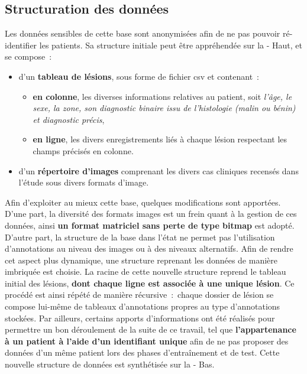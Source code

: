 \subsection{Structuration des données}
\label{sec:dataset_organisation}
Les données sensibles de cette base sont anonymisées afin de ne pas pouvoir ré-identifier les patients. Sa structure initiale peut être appréhendée sur la  - Haut, et se compose~:
\begin{itemize}
    \item d'un \textbf{tableau de lésions}, sous forme de fichier \gls{csv} et contenant~:
    \begin{itemize}
        \item \textbf{en colonne}, les diverses informations relatives au patient, soit \textit{l'âge, le sexe, la zone, son diagnostic binaire issu de l'histologie (malin ou bénin) et diagnostic précis},
        \item \textbf{en ligne}, les divers enregistrements liés à chaque lésion respectant les champs précisés en colonne.
    \end{itemize}
    \item d'un \textbf{répertoire d'images} comprenant les divers cas cliniques recensés dans l'étude sous divers formats d'image.
\end{itemize}\par

Afin d'exploiter au mieux cette base, quelques modifications sont apportées. D'une part, la diversité des formats images est un frein quant à la gestion de ces données, ainsi \textbf{un format matriciel sans perte de type bitmap} est adopté. D'autre part, la structure de la base dans l'état ne permet pas l'utilisation d'annotations au niveau des images ou à des niveaux alternatifs. Afin de rendre cet aspect plus dynamique, une structure reprenant les données de manière imbriquée est choisie. La racine de cette nouvelle structure reprend le tableau initial des lésions, \textbf{dont chaque ligne est associée à une unique lésion}. Ce procédé est ainsi répété de manière récursive~:~chaque dossier de lésion se compose lui-même de tableaux d'annotations propres au type d'annotations stockées. Par ailleurs, certains apports d'informations ont été réalisés pour permettre un bon déroulement de la suite de ce travail, tel que \textbf{l'appartenance à un patient à l'aide d'un identifiant unique} afin de ne pas proposer des données d'un même patient lors des phases d'entraînement et de test. Cette nouvelle structure de données est synthétisée sur la  - Bas.\par

